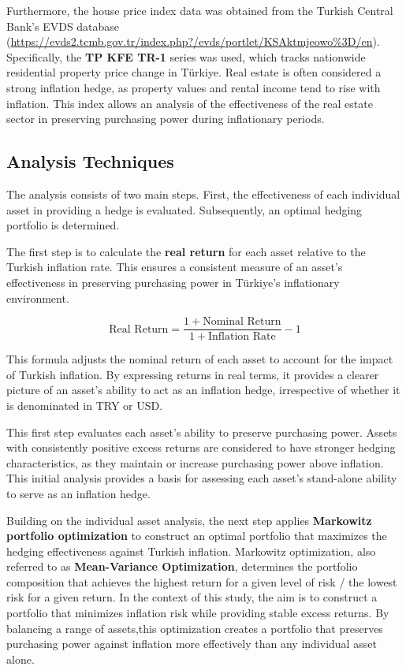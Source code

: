 \documentclass[
]{article}
\begin{document}
Furthermore, the house price index data was obtained from the Turkish
Central Bank's EVDS database
(\url{https://evds2.tcmb.gov.tr/index.php?/evds/portlet/KSAktmjeowo\%3D/en}).
Specifically, the \textbf{TP KFE TR-1} series was used, which tracks
nationwide residential property price change in Türkiye. Real estate is
often considered a strong inflation hedge, as property values and rental
income tend to rise with inflation. This index allows an analysis of the
effectiveness of the real estate sector in preserving purchasing power
during inflationary periods.

\subsection{Analysis Techniques}\label{analysis-techniques}

The analysis consists of two main steps. First, the effectiveness of
each individual asset in providing a hedge is evaluated. Subsequently,
an optimal hedging portfolio is determined.

The first step is to calculate the \textbf{real return} for each asset relative to the Turkish inflation rate. This ensures a consistent measure of an asset's effectiveness in preserving purchasing power in Türkiye's inflationary environment.

\[
\text{Real Return} = \frac{1 + \text{Nominal Return}}{1 + \text{Inflation Rate}} - 1
\]

This formula adjusts the nominal return of each asset to account for the impact of Turkish inflation. By expressing returns in real terms, it provides a clearer picture of an asset's ability to act as an inflation hedge, irrespective of whether it is denominated in TRY or USD.

This first step evaluates each asset's ability to preserve purchasing
power. Assets with consistently positive excess returns are considered
to have stronger hedging characteristics, as they maintain or increase
purchasing power above inflation. This initial analysis provides a basis
for assessing each asset's stand-alone ability to serve as an inflation
hedge.

Building on the individual asset analysis, the next step applies
\textbf{Markowitz portfolio optimization} to construct an optimal
portfolio that maximizes the hedging effectiveness against Turkish
inflation. Markowitz optimization, also referred to as
\textbf{Mean-Variance Optimization}, determines the portfolio
composition that achieves the highest return for a given level of risk /
the lowest risk for a given return. In the context of this study, the
aim is to construct a portfolio that minimizes inflation risk while
providing stable excess returns. By balancing a range of assets,this
optimization creates a portfolio that preserves purchasing power against
inflation more effectively than any individual asset alone.
\end{document}
